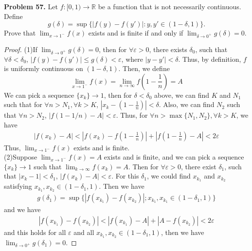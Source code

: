 \documentclass[12pt,leqno]{amsart}
\theoremstyle{definition}
\begin{document}
\noindent
{\bf Problem 57.}
Let $f:[0,1)\to\mathbb{R}$ be a function that is not necessarily continuous. Define
$$
g(\delta)=\sup\{|f(y)-f(y')|:y,y'\in (1-\delta,1)\}.
$$
Prove that $\displaystyle\lim_{x\to 1^-} f(x)$ exists and is finite if and only if $\displaystyle\lim_{\delta\to 0^+}g(\delta)=0$.
\begin{proof}
(1)If $\lim_{\delta\to 0^+}g(\delta)=0$, then for $\forall \varepsilon>0$, there exists $\delta_0$, such that $\forall \delta<\delta_0$, $|f(y)-f(y')|\leq g(\delta)<\varepsilon$, where $|y-y'|<\delta$. Thus, by definition, $f$ is uniformly continuous on $(1-\delta,1)$. Then, we define $$\lim_{x\to 1^-}f(x)=\lim_{n\to\infty}f\left(1-\frac{1}{n}\right)=A$$
We can pick a sequence $\{x_k\}\rightarrow 1$, then for $\delta<\delta_0$ above, we can find $K$ and $N_1$ such that for $\forall n>N_1, \forall k > K$, $|x_k-(1-\frac{1}{n})|<\delta$. Also, we can find $N_2$ such that $\forall n>N_2$, $|f(1-1/n)-A|<\varepsilon$. Thus, for $\forall n>\max\{N_1,N_2\}, \forall k > K$, we have
\begin{align*}
    |f(x_k)-A|<\left|f(x_k)-f\left(1-\frac{1}{n}\right)\right|+\left|f\left(1-\frac{1}{n}\right)-A\right|<2\varepsilon
\end{align*}
Thus, $\lim_{x\to 1^-}f(x)$ exists and is finite. \\
\hspace*{3em}(2)Suppose $\lim_{x\to 1^-}f(x)=A$ exists and is finite, and we can pick a sequence $\{x_k\}\rightarrow 1$ such that $\lim_{k\to\infty}f(x_k)=A$. Then for $\forall \varepsilon >0$, there exist $\delta_1$, such that $|x_k-1|<\delta_1$, $|f(x_k)-A|<\varepsilon$. For this $\delta_1$, we could find $x_{k_1}$ and $x_{k_2}$ satisfying $x_{k_1}, x_{k_2}\in(1-\delta_1,1)$. Then we have 
\begin{align*}
    g(\delta_1) = \sup \{|f(x_{k_1})-f(x_{k_2})|;x_{k_1},x_{k_1}\in (1-\delta_1,1)\} 
\end{align*}
and we have 
\begin{align*}
    |f(x_{k_1})-f(x_{k_2})| < |f(x_{k_1})-A|+|A-f(x_{k_2})| < 2\varepsilon
\end{align*}
and this holds for all $\varepsilon$ and all $x_{k_1}, x_{k_2}\in (1-\delta_1,1)$, then we have $\lim_{\delta\to 0^+}g(\delta_1)=0$.
\end{proof}

\medskip
\end{document}
